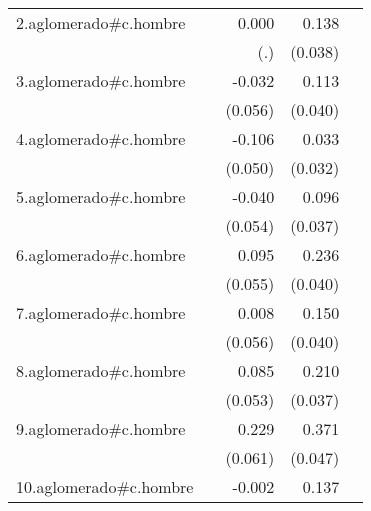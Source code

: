 {\begin{longtable}{l*{4}{D{.}{.}{-1}}}
\addlinespace
2.aglomerado#c.hombre&                     &       0.000         &       0.138\sym{***}&                     \\
            &                     &         (.)         &     (0.038)         &                     \\
\addlinespace
3.aglomerado#c.hombre&                     &      -0.032         &       0.113\sym{**} &                     \\
            &                     &     (0.056)         &     (0.040)         &                     \\
\addlinespace
4.aglomerado#c.hombre&                     &      -0.106\sym{*}  &       0.033         &                     \\
            &                     &     (0.050)         &     (0.032)         &                     \\
\addlinespace
5.aglomerado#c.hombre&                     &      -0.040         &       0.096\sym{**} &                     \\
            &                     &     (0.054)         &     (0.037)         &                     \\
\addlinespace
6.aglomerado#c.hombre&                     &       0.095         &       0.236\sym{***}&                     \\
            &                     &     (0.055)         &     (0.040)         &                     \\
\addlinespace
7.aglomerado#c.hombre&                     &       0.008         &       0.150\sym{***}&                     \\
            &                     &     (0.056)         &     (0.040)         &                     \\
\addlinespace
8.aglomerado#c.hombre&                     &       0.085         &       0.210\sym{***}&                     \\
            &                     &     (0.053)         &     (0.037)         &                     \\
\addlinespace
9.aglomerado#c.hombre&                     &       0.229\sym{***}&       0.371\sym{***}&                     \\
            &                     &     (0.061)         &     (0.047)         &                     \\
\addlinespace
10.aglomerado#c.hombre&                     &      -0.002         &       0.137\sym{***}&                     \\

\end{longtable}}

